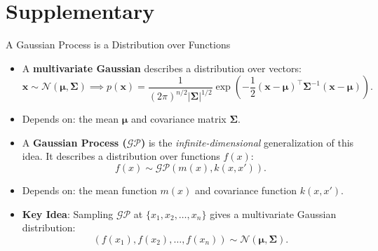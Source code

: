 \documentclass[9pt]{beamer}
\begin{document}
\section{Supplementary}

\begin{frame}{A Gaussian Process is a Distribution over Functions}
	\begin{itemize}
	    \setlength{\itemsep}{0.8em}
		\item A \textbf{multivariate Gaussian} describes a distribution over vectors:
		\[
		\mathbf{x} \sim \mathcal{N}(\boldsymbol{\mu}, \boldsymbol{\Sigma})
		\implies
		p(\mathbf{x})
		=
		\frac{1}{(2\pi)^{n/2} |\boldsymbol{\Sigma}|^{1/2}}
		\exp\!\left(
		-\frac{1}{2}
		(\mathbf{x}-\boldsymbol{\mu})^\top
		\boldsymbol{\Sigma}^{-1}
		(\mathbf{x}-\boldsymbol{\mu})
		\right).
		\]

		\item Depends on: the mean $\boldsymbol{\mu}$ and covariance matrix $\boldsymbol{\Sigma}$.

		\vspace{1.5em}
	
		\item A \textbf{Gaussian Process ($\mathcal{GP}$)} is the \emph{infinite-dimensional}
	    generalization of this idea. It describes a distribution over functions $f(x)$:
    	\[
			f(x) \sim \mathcal{GP}(m(x), k(x,x')).
    	\]

		\item Depends on: the mean function $m(x)$ and covariance function $k(x,x')$.

		\vspace{1.5em}

		\item \textbf{Key Idea}: Sampling $\mathcal{GP}$ at $\{x_1, x_2, \ldots, x_n\}$ gives a multivariate Gaussian distribution:
    	\[
			(f(x_1), f(x_2), \dots, f(x_n)) \sim \mathcal{N}(\boldsymbol{\mu}, \boldsymbol{\Sigma}).
    	\]
	\end{itemize}


\end{frame}
\end{document}
